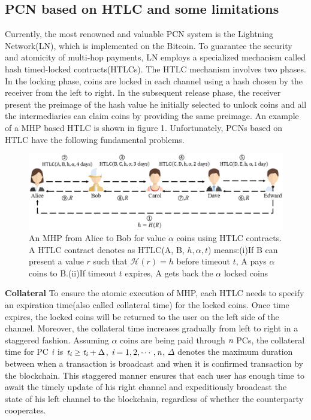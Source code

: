 \documentclass[conference]{IEEEtran}
\begin{document}
\subsection{PCN based on HTLC and some limitations}
Currently, the most renowned and valuable PCN system is the Lightning Network(LN), which is implemented on 
the Bitcoin. To guarantee the security and atomicity of multi-hop payments, LN employs a specialized mechanism called
hash timed-locked contracts(HTLCs). The HTLC mechanism involves two phases. In the locking phase, coins are locked in each 
channel using a hash chosen by the receiver from the left to right. In the subsequent release phase, the receiver present the preimage of the hash
value he initially selected to unlock coins and all the intermediaries can claim coins by providing the same preimage. An example of a MHP based
HTLC is shown in figure 1. Unfortunately, PCNs based on HTLC have the following fundamental problems.

\begin{figure}[b]
    \centering
    \includegraphics[scale=0.2]{fig.eps}
    \caption{An MHP from Alice to Bob for value $\alpha$ coins using HTLC contracts. A HTLC contract denotes as 
    HTLC(A, B, $h, \alpha, t$) means:(i)If B can present a value $r$ such that $\mathcal{H}(r)=h$ before timeout $t$,
    A pays $\alpha$ coins to B.(ii)If timeout $t$ expires, A gets back the $\alpha$ locked coins}
\end{figure}

\textbf{Collateral} To ensure the atomic execution of MHP, each HTLC needs to specify an expiration time(also called collateral time) for the locked 
coins. Once time expires, the locked coins will be returned to the user on the left side of the channel. Moreover, the collateral time increases gradually
from left to right in a staggered fashion. Assuming $\alpha$ coins are being paid through $\emph{n}$ PCs, the collateral time for 
PC $\emph{i}$ is $\emph{t}_{\emph{i}}\geq\emph{t}_{\emph{i}}+\Delta$, $\emph{i}=1,2,\cdots ,\emph{n}$, $\Delta$ denotes
the maximum duration between when a transaction is broadcast and when it is confirmed transaction by the blockchain. This staggered manner
ensures that each user has enough time to await the timely update of his right channel and expeditiously broadcast the state of his left channel to
the blockchain, regardless of whether the counterparty cooperates. 
\end{document}
